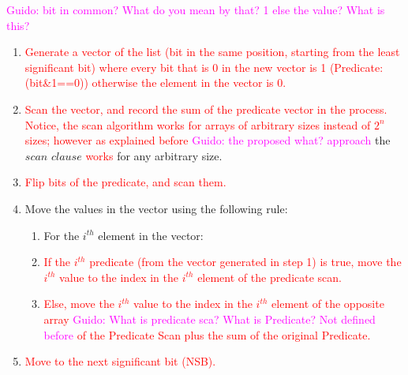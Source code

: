\documentclass[Ingles]{ic-tese-v1}
\newcommand{\guido}[1]{\noindent\textcolor{magenta}{Guido: {#1}}}
\newcommand{\ed}[1]{\noindent\textcolor{red}{ {#1}}}
\newcommand{\guido}[1]{}
\newcommand{\ed}[1]{}
\begin{document}
\guido{bit in common? What do you mean by that? 1 else the value? What is this?}
\begin{enumerate}
\item \ed{Generate a vector of the list (bit in the same position, starting from the least significant bit)
where every bit that is 0 in the new vector is 1 (Predicate: (bit\&1==0)) otherwise the element in the vector  is 0.}
\item \ed{Scan the vector, and record the sum of the predicate vector in the process. Notice, the scan
algorithm works for arrays of arbitrary sizes instead of $2^{n}$ sizes; however as 
explained before} \guido{the proposed what? approach} the $scan$ $clause$ \ed{works}  for any arbitrary size.
\item \ed{Flip bits of the predicate, and scan them.}
\item Move the values in the vector using the following rule:
\begin{enumerate}
\item For the $i^{th}$ element in the vector:
\item \ed{If the $i^{th}$ predicate (from the vector generated in step 1) is true, move the $i^{th}$
value to the index in the $i^{th}$ element of the predicate scan.}
\item \ed{Else, move the $i^{th}$ value to the index in the $i^{th}$ element of the opposite array
\guido{What is predicate sca? What is Predicate? Not defined before}
of the Predicate Scan plus the sum of the original Predicate.}
\end{enumerate}
\item \ed{Move to the next significant bit (NSB).}
\end{enumerate}
\end{document}
